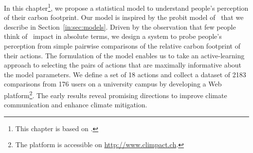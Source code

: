 In this chapter\footnote{This chapter is based on \citet{kristof2019user}.}, we propose a statistical model to understand people's perception of their carbon footprint.
Our model is inspired by the probit model of~\citet{thurstone1927method} that we describe in Section~\ref{in:sec:models}.
Driven by the observation that few people think of \COtwo\ impact in absolute terms, we design a system to probe people's perception from simple pairwise comparisons of the relative carbon footprint of their actions.
The formulation of the model enables us to take an active-learning approach to selecting the pairs of actions that are maximally informative about the model parameters.
We define a set of 18 actions and collect a dataset of 2183 comparisons from 176 users on a university campus by developing a Web platform\footnote{The platform is accessible on \href{http://www.climpact.ch}{http://www.climpact.ch}.}.
The early results reveal promising directions to improve climate communication and enhance climate mitigation.
